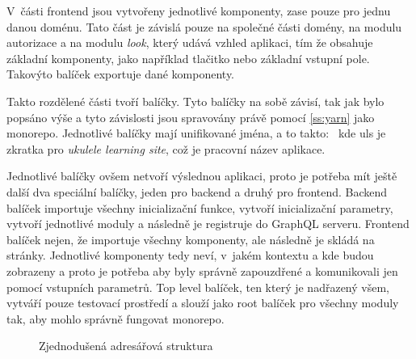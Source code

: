 V~části frontend jsou vytvořeny jednotlivé komponenty, zase pouze pro jednu danou doménu. Tato část je závislá pouze na společné části domény, na modulu autorizace a na modulu \emph{look}, který udává vzhled aplikaci, tím že obsahuje základní komponenty, jako například tlačitko nebo základní vstupní pole. Takovýto balíček exportuje dané komponenty.

Takto rozdělené části tvoří balíčky. Tyto balíčky na sobě závisí, tak jak bylo popsáno výše a tyto závislosti jsou spravovány právě pomocí \ref{ss:yarn} jako monorepo. Jednotlivé balíčky mají unifikované jména, a to takto:~ kde uls je zkratka pro \emph{ukulele learning site}, což je pracovní název aplikace.

Jednotlivé balíčky ovšem netvoří výslednou aplikaci, proto je potřeba mít ještě další dva speciální balíčky, jeden pro backend a druhý pro frontend. Backend balíček importuje všechny inicializační funkce, vytvoří inicializační parametry, vytvoří jednotlivé moduly a následně je registruje do GraphQL serveru. Frontend balíček nejen, že importuje všechny komponenty, ale následně je skládá na stránky. Jednotlivé komponenty tedy neví, v~jakém kontextu a kde budou zobrazeny a proto je potřeba aby byly správně zapouzdřené a komunikovali jen pomocí vstupních parametrů. Top level balíček, ten který je nadřazený všem, vytváří pouze testovací prostředí a slouží jako root balíček pro všechny moduly tak, aby mohlo správně fungovat monorepo.


\begin{figure}
    \caption{Zjednodušená adresářová struktura}
    \label{fig:modules}
\end{figure}

